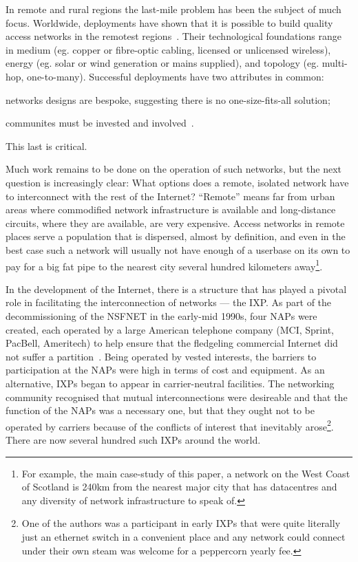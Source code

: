 In remote and rural regions the last-mile problem has been the subject of much
focus. Worldwide, deployments have shown that it is possible to build quality
access networks in the remotest regions~\cite{xxx}. Their technological
foundations range in medium (eg. copper or fibre-optic cabling, licensed
or unlicensed wireless), energy (eg. solar or wind generation or
mains supplied), and topology (eg. multi-hop,
one-to-many). Successful deployments
have two attributes in common:
\begin{inparaenum}[(i)]
  \item networks designs are bespoke, suggesting
    there is no one-size-fits-all solution;
  \item communites must be invested and involved~\cite{Wallace:2015a,
    Wallace2015b}.
\end{inparaenum}
This last is critical.

Much work remains to be done on the operation of such networks, but
the next question is increasingly clear: What options does a remote,
isolated network have to interconnect with the rest of the Internet?
``Remote'' means far from urban areas where commodified network
infrastructure is available and long-distance circuits, where they are
available, are very expensive. Access networks in remote places serve
a population that is dispersed, almost by definition, and even in the
best case such a network will usually not have enough of a userbase on
its own to pay for a big fat pipe to the nearest city several hundred
kilometers away\footnote{For example, the main case-study of this
paper, a network on the West Coast of Scotland is 240km from the
nearest major city that has datacentres and any diversity of network
infrastructure to speak of.}.

In the development of the Internet, there is a structure that has
played a pivotal role in facilitating the interconnection of networks
--- the \acf{IXP}. As part of the decommissioning of the \ac{NSFNET}
in the early-mid 1990s, four \acp{NAP} were created, each operated by
a large American telephone company (MCI, Sprint, PacBell, Ameritech)
to help ensure that the fledgeling commercial Internet did not suffer
a
partition~\cite{hayes1997computing,Ager:2012:ALE:2342356.2342393}. Being
operated by vested interests, the barriers to participation at
the \acp{NAP} were high in terms of cost and equipment. As an
alternative, \acp{IXP} began to appear in carrier-neutral
facilities. The networking community recognised that mutual
interconnections were desireable and that the function of
the \acp{NAP} was a necessary one, but that they ought not to be
operated by carriers because of the conflicts of interest that
inevitably arose\footnote{One of the authors was a participant in
early \acp{IXP} that were quite literally just an ethernet switch in a
convenient place and any network could connect under their own steam
was welcome for a peppercorn yearly fee.}. There are now several
hundred such \acp{IXP} around the world.

